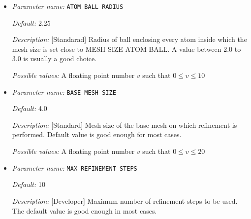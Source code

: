 \begin{itemize}
\item {\it Parameter name:} {\tt ATOM BALL RADIUS}
\label{parameters:Finite element mesh parameters/Auto mesh generation parameters/ATOM BALL RADIUS}
\label{parameters:Finite_20element_20mesh_20parameters/Auto_20mesh_20generation_20parameters/ATOM_20BALL_20RADIUS}




{\it Default:} 2.25


{\it Description:} [Standarad] Radius of ball enclosing every atom inside which the mesh size is set close to MESH SIZE ATOM BALL. A value between 2.0 to 3.0 is usually a good choice.


{\it Possible values:} A floating point number $v$ such that $0 \leq v \leq 10$
\item {\it Parameter name:} {\tt BASE MESH SIZE}
\label{parameters:Finite element mesh parameters/Auto mesh generation parameters/BASE MESH SIZE}
\label{parameters:Finite_20element_20mesh_20parameters/Auto_20mesh_20generation_20parameters/BASE_20MESH_20SIZE}




{\it Default:} 4.0


{\it Description:} [Standard] Mesh size of the base mesh on which refinement is performed. Default value is good enough for most cases.


{\it Possible values:} A floating point number $v$ such that $0 \leq v \leq 20$
\item {\it Parameter name:} {\tt MAX REFINEMENT STEPS}
\label{parameters:Finite element mesh parameters/Auto mesh generation parameters/MAX REFINEMENT STEPS}
\label{parameters:Finite_20element_20mesh_20parameters/Auto_20mesh_20generation_20parameters/MAX_20REFINEMENT_20STEPS}




{\it Default:} 10


{\it Description:} [Developer] Maximum number of refinement steps to be used. The default value is good enough in most cases.



\end{itemize}

